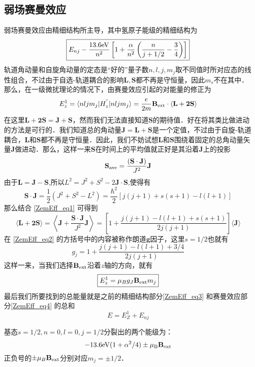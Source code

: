 \subsection{弱场赛曼效应}
弱场赛曼效应由精细结构所主导，其中氢原子能级的精细结构为\begin{equation}\label{ZemEff_eq3}
\boxed{E_{nj}-\frac{13.6\rm{eV}}{n^2}\left[1+\frac{\alpha}{n^2}\left(\frac{n}{j+1/2}-\frac{3}{4}\right)\right]}
\end{equation}
轨道角动量和自旋角动量的定态是“好的”量子数$n,l,j,m_j$取不同值时所对应态的线性组合，不过由于自选-轨道耦合的影响$\mathbf{L,S}$都不再是守恒量，因此$m_s$不在其中．那么，在一级微扰理论的情况下，由赛曼效应引起的对能量的修正为
$$
E_z^{1}=\langle nljm_j|H_z^{'}|nljm_j\rangle=\frac{e}{2m}\mathbf{B}_{\rm{ext}}\cdot\langle\mathbf{L+2S}\rangle
$$
在这里$\mathbf{L+2S=J+S}$，然而我们无法直接知道$\mathbf{S}$的期待值．好在将其类比做进动的方法是可行的．我们知道总的角动量$\mathbf{J=L+S}$是一个定值，不过由于自旋-轨道耦合，$\mathbf{L}$和$\mathbf{S}$都不再是守恒量．因此，我们不妨试想$\mathbf{L}$和$\mathbf{S}$围绕着固定的总角动量矢量$\mathbf{J}$做进动．那么，这样一来$\mathbf{S}$在时间上的平均值就正好是其沿着$\mathbf{J}$上的投影
\begin{equation}\label{ZemEff_eq1}
\mathbf{S}_{\rm{ave}}=\frac{(\mathbf{S\cdot J})}{J^2}\mathbf{J}
\end{equation}
由于$\mathbf{L=J-S}$,所以$L^2=J^2+S^2-2\mathbf{J\cdot S}$,使得有
\begin{equation}
\mathbf{S\cdot J}=\frac{1}{2}(J^2+S^2-L^2)=\frac{\hbar^2}{2}[j(j+1)+s(s+1)-l(l+1)]
\end{equation}
那么结合 \autoref{ZemEff_eq1} 可得到
\begin{equation}\label{ZemEff_eq2}
\langle \mathbf{L+2S}\rangle =\left\langle \mathbf{J}+\frac{\mathbf{S\cdot J}}{J^2}\mathbf{J}\right\rangle=\left[1+\frac{j(j+1)-l(l+1)+s(s+1)}{2j(j+1)}\right]\langle\mathbf{J}\rangle
\end{equation}
在 \autoref{ZemEff_eq2} 的方括号中的内容被称作朗道$\mathbf{g}$因子，这里$s=1/2$也就有
\begin{equation}
g_j=1+\frac{j(j+1)-l(l+1)+3/4}{2j(j+1)}
\end{equation}
这样一来，当我们选择$\mathbf{B}_{\rm{ext}}$沿着$z$轴的方向，就有
\begin{equation}\label{ZemEff_eq4}
\boxed{E^1_z =\mu_Bg_J\mathbf{B}_{\rm{ext}}m_j}
\end{equation}
最后我们所要找到的总能量就是之前的精细结构部分\autoref{ZemEff_eq3} 和赛曼效应部分\autoref{ZemEff_eq4} 的总和
\begin{equation}
\boxed{E=E_Z^1+E_{nj}}
\end{equation}
\begin{example}{}
基态$s=1/2,n=0,l=0,j=1/2$分裂出的两个能级为：
\begin{equation}
-13.6\rm{eV}(1+\alpha^2/4)\pm\mu_B\mathbf{B}_{\rm{ext}}\notag
\end{equation}
正负号的$\pm\mu_B\mathbf{B}_{\rm{ext}}$分别对应$m_j=\pm1/2$．
\end{example}




